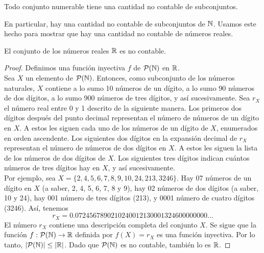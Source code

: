 \message{ !name(main.tex)}\documentclass[12pt,a4paper]{book}
\begin{document}
    \begin{corolario}\label{cor:numerable-subconjuntos-no-contable}
        Todo conjunto numerable tiene una cantidad no contable de subconjuntos.
    \end{corolario}

    En particular, hay una cantidad no contable de subconjuntos de $\mathbb{N}$. Usamos este hecho para mostrar que hay una
    cantidad no contable de números reales.

    \begin{proposicion}\label{prop:R-no-contable}
        El conjunto de los números reales $\mathbb{R}$ es no contable.
    \end{proposicion}
    \begin{proof}
        Definimos una función inyectiva $f$ de $\mathcal{P}(\mathbb{N})$ en $\mathbb{R}$.\\
        Sea $X$ un elemento de $\mathcal{P}(\mathbb{N})$. Entonces, como subconjunto de los números naturales, $X$ contiene a lo sumo 10
        números de un dígito, a lo sumo 90 números de dos dígitos, a lo sumo 900 números de tres dígitos, y así
        sucesivamente. Sea $r_{X}$ el número real entre 0 y 1 descrito de la siguiente manera. Los primeros dos dígitos
        después del punto decimal representan el número de números de un dígito en $X$. A estos les siguen cada uno de los
        números de un dígito de $X$, enumerados en orden ascendente. Los siguientes dos dígitos en la expansión decimal de
        $r_{X}$ representan el número de números de dos dígitos en $X$. A estos les siguen la lista de los números de dos
        dígitos de $X$. Los siguientes tres dígitos indican cuántos números de tres dígitos hay en $X$, y así
        sucesivamente.\\
        Por ejemplo, sea $X=\{2,4,5,6,7,8,9,10,24,213,3246\}$. Hay 07 números de un dígito en $X$ (a saber, 2, 4, 5, 6, 7,
        8 y 9), hay 02 números de dos dígitos (a saber, 10 y 24), hay 001 número de tres dígitos (213), y 0001 número de
        cuatro dígitos (3246). Así, tenemos
        \begin{equation*}
            r_{X}=0.0724567890210240012130001324600000000\dots
        \end{equation*}
        El número $r_{X}$ contiene una descripción completa del conjunto $X$. Se sigue que la función
        $f:\mathcal{P}(\mathbb{N})\rightarrow\mathbb{R}$ definida por $f(X)=r_{X}$ es una función inyectiva. Por lo tanto, $|\mathcal{P}(\mathbb{N})|\leq|\mathbb{R}|$.
        Dado que $\mathcal{P}(\mathbb{N})$ es no contable, también lo es $\mathbb{R}$.
    \end{proof}
\end{document}
